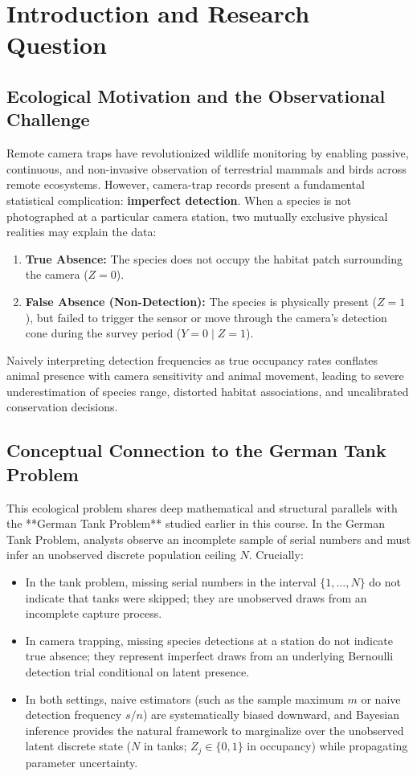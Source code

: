 \documentclass[11pt,a4paper]{article}
\begin{document}
\section{Introduction and Research Question}

\subsection{Ecological Motivation and the Observational Challenge}
Remote camera traps have revolutionized wildlife monitoring by enabling passive, continuous, and non-invasive observation of terrestrial mammals and birds across remote ecosystems. However, camera-trap records present a fundamental statistical complication: \textbf{imperfect detection}. When a species is not photographed at a particular camera station, two mutually exclusive physical realities may explain the data:
\begin{enumerate}
    \item \textbf{True Absence:} The species does not occupy the habitat patch surrounding the camera ($Z = 0$).
    \item \textbf{False Absence (Non-Detection):} The species is physically present ($Z = 1$), but failed to trigger the sensor or move through the camera's detection cone during the survey period ($Y = 0 \mid Z = 1$).
\end{enumerate}

Naively interpreting detection frequencies as true occupancy rates conflates animal presence with camera sensitivity and animal movement, leading to severe underestimation of species range, distorted habitat associations, and uncalibrated conservation decisions.

\subsection{Conceptual Connection to the German Tank Problem}
This ecological problem shares deep mathematical and structural parallels with the **German Tank Problem** studied earlier in this course. In the German Tank Problem, analysts observe an incomplete sample of serial numbers and must infer an unobserved discrete population ceiling $N$. Crucially:
\begin{itemize}
    \item In the tank problem, missing serial numbers in the interval $\{1, \dots, N\}$ do not indicate that tanks were skipped; they are unobserved draws from an incomplete capture process.
    \item In camera trapping, missing species detections at a station do not indicate true absence; they represent imperfect draws from an underlying Bernoulli detection trial conditional on latent presence.
    \item In both settings, naive estimators (such as the sample maximum $m$ or naive detection frequency $s/n$) are systematically biased downward, and Bayesian inference provides the natural framework to marginalize over the unobserved latent discrete state ($N$ in tanks; $Z_j \in \{0, 1\}$ in occupancy) while propagating parameter uncertainty.
\end{itemize}
\end{document}
